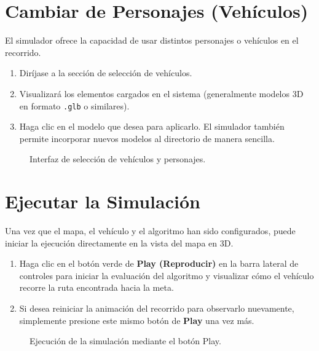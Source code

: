 \documentclass[12pt]{article}
\begin{document}
\section{Cambiar de Personajes (Vehículos)}
El simulador ofrece la capacidad de usar distintos personajes o vehículos en el recorrido.
\begin{enumerate}
    \item Diríjase a la sección de selección de vehículos.
    \item Visualizará los elementos cargados en el sistema (generalmente modelos 3D en formato \texttt{.glb} o similares).
    \item Haga clic en el modelo que desea para aplicarlo. El simulador también permite incorporar nuevos modelos al directorio de manera sencilla.
\end{enumerate}

\begin{figure}[h!]
    \centering
    \vspace{6cm} %
    \caption{Interfaz de selección de vehículos y personajes.}
\end{figure}

\section{Ejecutar la Simulación}
Una vez que el mapa, el vehículo y el algoritmo han sido configurados, puede iniciar la ejecución directamente en la vista del mapa en 3D.
\begin{enumerate}
    \item Haga clic en el botón verde de \textbf{Play (Reproducir)} en la barra lateral de controles para iniciar la evaluación del algoritmo y visualizar cómo el vehículo recorre la ruta encontrada hacia la meta.
    \item Si desea reiniciar la animación del recorrido para observarlo nuevamente, simplemente presione este mismo botón de \textbf{Play} una vez más.
\end{enumerate}

\begin{figure}[h!]
    \centering
    \vspace{6cm} %
    \caption{Ejecución de la simulación mediante el botón Play.}
\end{figure}
\end{document}
